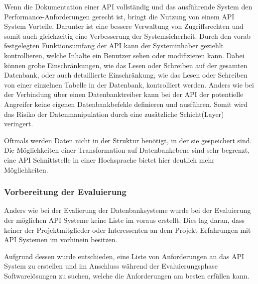 Wenn die Dokumentation einer API vollständig und das ausführende System den
Performance-Anforderungen gerecht ist, bringt die Nutzung von einem API System
Vorteile. Darunter ist eine bessere Verwaltung von Zugriffsrechten und somit
auch gleichzeitig eine Verbesserung der Systemsicherheit. Durch den vorab
festgelegten Funktionsumfang der API kann der Systeminhaber geziehlt
kontrollieren, welche Inhalte ein Benutzer sehen oder modifizieren kann. Dabei
können grobe Einschränkungen, wie das Lesen oder Schreiben auf der gesamten
Datenbank, oder auch detaillierte Einschränkung, wie das Lesen oder Schreiben
von einer einzelnen Tabelle in der Datenbank, kontrolliert werden. Anders wie
bei der Verbindung über einen Datenbanktreiber kann bei der API der potentielle
Angreifer keine eigenen Datenbankbefehle definieren und ausführen. Somit wird
das Risiko der Datenmanipulation durch eine zusätzliche Schicht(Layer)
veringert.

Oftmals werden Daten nicht in der Struktur benötigt, in der sie gespeichert
sind. Die Möglichkeiten einer Transformation auf Datenbankebene sind sehr
begrenzt, eine API Schnittstelle in einer Hochsprache bietet hier deutlich mehr
Möglichkeiten.
\nl%

\subsubsection{Vorbereitung der Evaluierung}
\label{subsubsec:api_vorbereitung_der_evaluierung}
Anders wie bei der Evalierung der Datenbanksysteme wurde bei der Evaluierung
der möglichen API Systeme keine Liste im voraus erstellt. Dies lag daran, dass
keiner der Projektmitglieder oder Interessenten an dem Projekt Erfahrungen mit
API Systemen im vorhinein besitzen.

Aufgrund dessen wurde entschieden, eine Liste von Anforderungen an das
API System zu erstellen und im Anschluss während der Evaluierungsphase
Softwarelösungen zu suchen, welche die Anforderungen am besten erfüllen kann.

